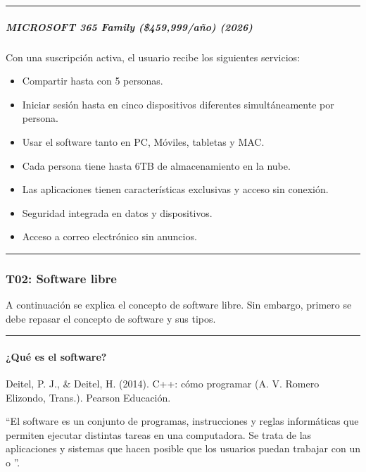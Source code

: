 \documentclass[letterpaper,10pt,spanish]{sphinxmanual}
\begin{document}
\bigskip\hrule\bigskip



\subparagraph{MICROSOFT 365 Family (\$459,999/año) (2026)}
\label{\detokenize{cursos/ofimatica10/recursos/T01:microsoft-365-family-459-999-ano-2026}}
\sphinxAtStartPar
\sphinxfootnotemark[3] Con una suscripción activa, el usuario recibe los siguientes servicios:
\begin{itemize}
\item {} 
\sphinxAtStartPar
Compartir hasta con 5 personas.

\item {} 
\sphinxAtStartPar
Iniciar sesión hasta en cinco dispositivos diferentes simultáneamente por persona.

\item {} 
\sphinxAtStartPar
Usar el software tanto en PC, Móviles, tabletas y MAC.

\item {} 
\sphinxAtStartPar
Cada persona tiene hasta 6TB de almacenamiento en la nube.

\item {} 
\sphinxAtStartPar
Las aplicaciones tienen características exclusivas y acceso sin conexión.

\item {} 
\sphinxAtStartPar
Seguridad integrada en datos y dispositivos.

\item {} 
\sphinxAtStartPar
Acceso a correo electrónico sin anuncios.

\end{itemize}


\bigskip\hrule\bigskip


\sphinxstepscope


\subsubsection{T02: Software libre}
\label{\detokenize{cursos/ofimatica10/recursos/T02:t02-software-libre}}\label{\detokenize{cursos/ofimatica10/recursos/T02::doc}}
\sphinxAtStartPar
A continuación se explica el concepto de software libre. Sin embargo, primero se debe repasar el concepto de software y sus tipos.


\bigskip\hrule\bigskip



\paragraph{¿Qué es el software?}
\label{\detokenize{cursos/ofimatica10/recursos/T02:que-es-el-software}}
\sphinxAtStartPar
%
\begin{footnote}[1]\sphinxAtStartFootnote
Deitel, P. J., \& Deitel, H. (2014). C++: cómo programar (A. V. Romero Elizondo, Trans.). Pearson Educación.
%
\end{footnote} “El software es un conjunto de programas, instrucciones y reglas informáticas que permiten ejecutar distintas tareas en una computadora. Se trata de las aplicaciones y sistemas que hacen posible que los usuarios puedan trabajar con un  o ”.
\end{document}
